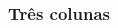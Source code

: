 \documentclass[aspectratio=169]{beamer}
\begin{document}
\begin{frame}[fragile] \frametitle{Três colunas}
\vspace{-1em}
\begin{columns}[t]
\begin{column}{0.32\linewidth}
  \begin{block}{\lipsum[1][14]}
    \lipsum[1][15-16]
    \vspace{1em}
    \lipsum[1][17-18]
  \end{block}
\end{column}
\begin{column}{0.32\linewidth}
  \begin{block}{\lipsum[2][1]}
    \lipsum[2][2-4]
  \end{block}
\end{column}
\begin{column}{0.32\linewidth}
  \begin{exampleblock}{}
  \end{exampleblock}
\end{column}
\end{columns}
\end{frame}
\end{document}
